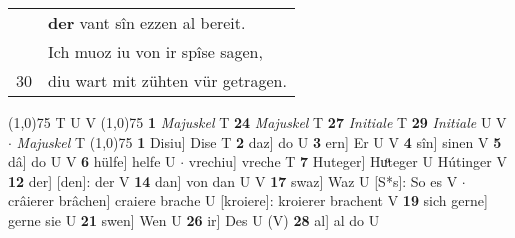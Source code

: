 \documentclass[8pt,a4paper,notitlepage]{article}
\begin{document}
\begin{table}[ht]
\begin{minipage}[t]{0.5\linewidth}
\begin{tabular}{rl}
 & \textbf{der} vant sîn ezzen al bereit.\\ 
 & Ich muoz iu von ir spîse sagen,\\ 
30 & diu wart mit zühten vür getragen.\\ 
\end{tabular}
\scriptsize
\line(1,0){75} \newline
T U V \newline
\line(1,0){75} \newline
\textbf{1} \textit{Majuskel} T  \textbf{24} \textit{Majuskel} T  \textbf{27} \textit{Initiale} T  \textbf{29} \textit{Initiale} U V   $\cdot$ \textit{Majuskel} T  \newline
\line(1,0){75} \newline
\textbf{1} Disiu] Dise T \textbf{2} daz] do U \textbf{3} ern] Er U V \textbf{4} sîn] sinen V \textbf{5} dâ] do U V \textbf{6} hülfe] helfe U  $\cdot$ vrechiu] vreche T \textbf{7} Huteger] Huͦteger U Hútinger V \textbf{12} der] [den]: der V \textbf{14} dan] von dan U V \textbf{17} swaz] Waz U [S*s]: So es V  $\cdot$ crâierer brâchen] craiere brache U [kroiere]: kroierer brachent V \textbf{19} sich gerne] gerne sie U \textbf{21} swen] Wen U \textbf{26} ir] Des U (V) \textbf{28} al] al do U \newline
\end{minipage}
\end{table}
\end{document}

